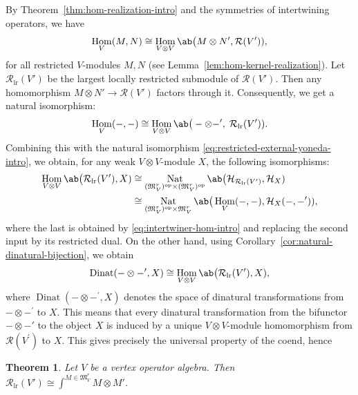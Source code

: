 \documentclass[12pt, english]{article}
\numberwithin{equation}{section}
\DeclareMathOperator{\Hom}{Hom}
\DeclareMathOperator{\opp}{op}
\DeclareMathOperator{\lr}{lr}
\DeclareMathOperator{\Nat}{Nat}
\theoremstyle{plain}
\newtheorem{mainthm}{Theorem}
\theoremstyle{definition}
\theoremstyle{remark}
\begin{document}
	
	By  Theorem~\ref{thm:hom-realization-intro} and the symmetries of intertwining operators, we have
	\[
	\Hom_V(M, N)
	\cong \Hom_{V\otimes V}
	\ab\big(M\otimes N', \mathcal{R}(V')),
	\]
	for all restricted $V$-modules $M, N$ (see Lemma~\ref{lem:hom-kernel-realization}).
	Let $\mathcal{R}_{\lr}(V')$ be the largest locally restricted submodule of $\mathcal{R}(V')$.
	Then any homomorphism $M\otimes N' \to \mathcal{R}(V')$ factors through it.
	Consequently, we get a natural isomorphism:
	\[
	\Hom_V(-, -) \cong \Hom_{V\otimes V} \ab\big( -\otimes -', \; \mathcal{R}_{\lr}(V')).
	\]
	Combining this with the natural isomorphism \eqref{eq:restricted-external-yoneda-intro}, we obtain, for any weak $V\otimes V$-module $X$, the following isomorphisms:
	\[
	\begin{aligned}
		\Hom_{V\otimes V} \ab\big(\mathcal{R}_{\lr}(V'), X)
		&\cong
		\Nat_{(\mathfrak{M}^r_V)^{\opp}\times(\mathfrak{M}^r_V)^{\opp}} \ab\big(\mathcal{H}_{\mathcal{R}_{\lr}(V')}, \mathcal{H}_X)
		\\
		&\cong
		\Nat_{(\mathfrak{M}^r_V)^{\opp}\times\mathfrak{M}^r_V} \ab\big(\Hom_V(-,-), \mathcal{H}_X(-, -^\prime)),
	\end{aligned}
	\]
	where the last is obtained by \eqref{eq:intertwiner-hom-intro} and replacing the second input by its restricted dual.
	On the other hand, using Corollary~\ref{cor:natural-dinatural-bijection}, we obtain
	\begin{equation} \label{Intro-Dinat=Hom}
		\operatorname{Dinat}( -\otimes-^\prime, X) \cong \Hom_{V\otimes V} \ab\big(\mathcal{R}_{\lr}(V'), X),
	\end{equation}
	where $\operatorname{Dinat}(-\otimes-^\prime, X)$ denotes the space of dinatural transformations from $-\otimes -^\prime$ to $X$.
	This means that every dinatural transformation from the bifunctor $-\otimes -'$ to the object $X$   
	is induced by a unique $V\otimes V$-module homomorphism from $\mathcal {R}(V^\prime)$ to $X$.
	This gives precisely the universal property of the coend, hence
	\begin{mainthm}\label{thm:restricted-coend-intro}
		Let $V$ be a vertex operator algebra. Then  $\displaystyle \mathcal{R}_{\lr}(V') \cong \int^{M\in\mathfrak{M}^r_V} M\otimes M'$.
	\end{mainthm}
	
	
	\begin{center}
		\textbf{\textasteriskcentered\qquad\textasteriskcentered\qquad\textasteriskcentered}
	\end{center}
	
\end{document}
